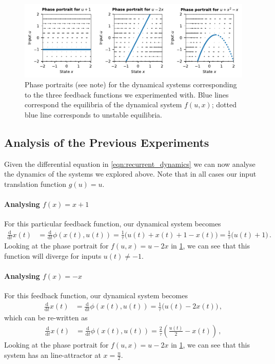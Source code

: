 \documentclass[10pt,letterpaper,oneside]{article}
\begin{document}
\begin{figure}
	\centering
	\includegraphics{media/phase_portraits.pdf}
	\caption{Phase portraits (see note) for the dynamical systems corresponding to the three feedback functions we experimented with. Blue lines correspond the equilibria of the dynamical system $f(u, x)$; dotted blue line corresponds to unstable equilibria.  }
	\label{fig:phase_portraits}
\end{figure}

\subsection{Analysis of the Previous Experiments}

Given the differential equation in \cref{eqn:recurrent_dynamics} we can now analyse the dynamics of the systems we explored above. Note that in all cases our input translation function $g(u) = u$.

\paragraph{Analysing $f(x) = x + 1$}
For this particular feedback function, our dynamical system becomes
\begin{align*}
	\frac{\mathrm{d}}{\mathrm{d}t} x(t) &= \frac{\mathrm{d}}{\mathrm{d}t} \phi(x(t), u(t)) = \frac{1}{\tau} \big(u(t) + x(t) + 1 - x(t) \big) = \frac{1}{\tau} \big(u(t) + 1 \big) \,.
\end{align*}
Looking at the phase portrait for $f(u, x) = u - 2 x$ in \cref{fig:phase_portraits}, we can see that this function will diverge for inputs $u(t) \neq -1$.

\paragraph{Analysing $f(x) = -x$}
For this feedback function, our dynamical system becomes
\begin{align*}
	\frac{\mathrm{d}}{\mathrm{d}t} x(t) &= \frac{\mathrm{d}}{\mathrm{d}t} \phi(x(t), u(t)) = \frac{1}{\tau} \big(u(t) - 2 x(t) \big) \,,
\end{align*}
which can be re-written as
\begin{align*}
	\frac{\mathrm{d}}{\mathrm{d}t} x(t) &= \frac{\mathrm{d}}{\mathrm{d}t} \phi(x(t), u(t)) = \frac{2}{\tau} \left(\frac{u(t)}{2} - x(t) \right) \,,
\end{align*}
Looking at the phase portrait for $f(u, x) = u - 2x$ in \cref{fig:phase_portraits}, we can see that this system has an line-attractor at $x = \frac{u}{2}$.
\end{document}
